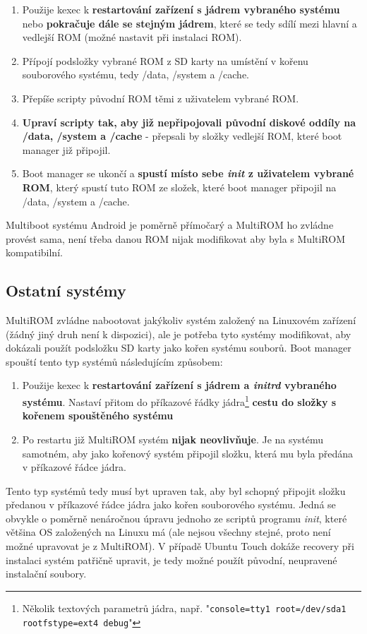 \documentclass[12pt, a4paper, oneside]{article}
\newcommand{\B}{\textbf} %
\newcommand{\It}{\textit}  %
\begin{document}
\begin{enumerate}
    \item Použije kexec k \B{restartování zařízení s jádrem vybraného systému} nebo \B{pokračuje dále se stejným jádrem}, které se tedy sdílí mezi hlavní a vedlejší ROM (možné nastavit při instalaci ROM).
    \item Přípojí podsložky vybrané ROM z SD karty na umístění v kořenu souborového systému, tedy /data, /system a /cache.
    \item Přepíše scripty původní ROM těmi z uživatelem vybrané ROM.
    \item \B{Upraví scripty tak, aby již nepřipojovali původní diskové oddíly na /data, /system a /cache} - přepsali by složky vedlejší ROM, které boot manager již připojil.
    \item Boot manager se ukončí a \B{spustí místo sebe \It{init} z uživatelem vybrané ROM}, který spustí tuto ROM ze složek, které boot manager připojil na /data, /system a /cache.
\end{enumerate}

Multiboot systému Android je poměrně přímočarý a MultiROM ho zvládne provést sama, není třeba danou ROM nijak modifikovat aby byla s MultiROM kompatibilní.

\subsection{Ostatní systémy}
MultiROM zvládne nabootovat jakýkoliv systém založený na Linuxovém zařízení (žádný jiný druh není k dispozici), ale je potřeba tyto systémy modifikovat, aby dokázali použít podsložku SD karty jako kořen systému souborů. Boot manager spouští tento typ systémů následujícím způsobem:
\begin{enumerate}
    \item Použije kexec k \B{restartování zařízení s jádrem a \It{initrd} vybraného systému}. Nastaví přitom do příkazové řádky jádra\footnote{Několik textových parametrů jádra, např. "\verb-console=tty1 root=/dev/sda1 rootfstype=ext4 debug-"} \B{cestu do složky s kořenem spouštěného systému}
    \item Po restartu již MultiROM systém \B{nijak neovlivňuje}. Je na systému samotném, aby jako kořenový systém připojil složku, která mu byla předána v příkazové řádce jádra.
\end{enumerate}

Tento typ systémů tedy musí byt upraven tak, aby byl schopný připojit složku předanou v příkazové řádce jádra jako kořen souborového systému. Jedná se obvykle o poměrně nenáročnou úpravu jednoho ze scriptů programu \It{init}, které většina OS založených na Linuxu má (ale nejsou všechny stejné, proto není možné upravovat je z MultiROM). V případě Ubuntu Touch dokáže recovery při instalaci systém patřičně upravit, je tedy možné použít původní, neupravené instalační soubory.
\end{document}
